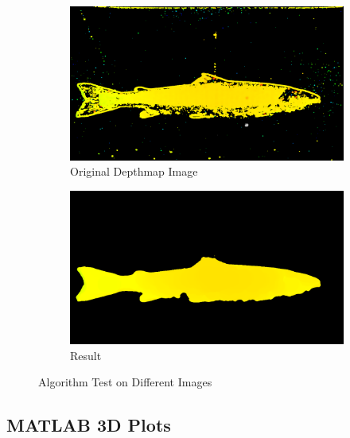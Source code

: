 \begin{figure}[H]
    \medskip
    \begin{subfigure}{0.49\textwidth}
        \includegraphics[width=\linewidth]{images/results/algorithm_test/original_87}
        \caption{Original Depthmap Image} 
        \label{fig:original_depthmap_87}
    \end{subfigure}\hspace*{\fill}
    \begin{subfigure}{0.49\textwidth}
        \includegraphics[width=\linewidth]{images/results/algorithm_test/median_filter_87}
        \caption{Result} 
        \label{fig:result_87}
    \end{subfigure}
    
    \caption{Algorithm Test on Different Images} 
    \label{fig:algorithm_test}
\end{figure}





\subsection{MATLAB 3D Plots}

